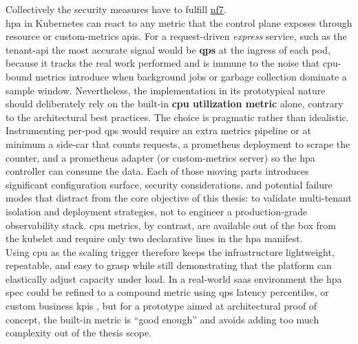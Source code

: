 \documentclass[11pt, a4paper, oneside, listof=totoc]{scrartcl}
\begin{document}
                Collectively the security measures have to fulfill \hyperlink{NF-07}{nf7}. \\
                \gls{hpa} in Kubernetes can react to any metric that the control plane exposes
                through resource or custom-metrics \glspl{api}.
                For a request-driven \textit{\gls{express}} service, such as the tenant-\gls{api} the most
                accurate signal would be \textbf{\gls{qps}} at the \gls{ingress} of each pod, because it
                tracks the real work performed and is immune to the noise that \gls{cpu}-bound
                metrics introduce when background jobs or garbage collection dominate a sample
                window.
                Nevertheless, the implementation in its prototypical nature should deliberately rely
                on the built-in \textbf{\gls{cpu} utilization metric} alone, contrary to the
                architectural best practices.
                The choice is pragmatic rather than idealistic.
                Instrumenting per-pod \gls{qps} would require an extra metrics pipeline or at
                minimum a side-car that counts requests, a \gls{prometheus} deployment to scrape the
                counter, and a \gls{prometheus} adapter (or custom-metrics server) so the \gls{hpa}
                controller can consume the data.
                Each of those moving parts introduces significant configuration surface, security
                considerations, and potential failure modes that distract from the core objective of
                this thesis: to validate multi-tenant isolation and deployment strategies, not to
                engineer a production-grade observability stack.
                \gls{cpu} metrics, by contrast, are available out of the box from the kubelet and
                require only two declarative lines in the \gls{hpa} manifest.
                \\
                Using \gls{cpu} as the scaling trigger therefore keeps the infrastructure
                lightweight, repeatable, and easy to grasp while still demonstrating that the
                platform can elastically adjust capacity under load.
                In a real-world \gls{saas} environment the \gls{hpa} spec could be refined to a
                compound metric using \gls{qps} latency percentiles, or custom business \glspl{kpi}
                , but for a prototype aimed at architectural proof of concept, the
                built-in metric is \enquote{good enough} and avoids adding too much complexity out
                of the thesis scope.
                
\end{document}
